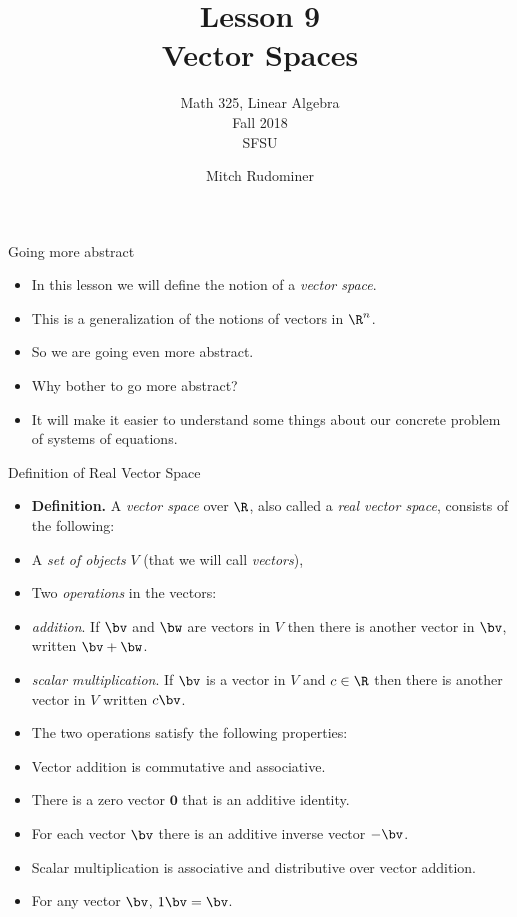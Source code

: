 \documentclass{beamer}
\title{Lesson 9 \\ Vector Spaces}
\subtitle{Math 325, Linear Algebra \\ Fall 2018 \\ SFSU}
\author{Mitch Rudominer}
\date{}
\begin{document}
\begin{frame}
  \titlepage
\end{frame}

\begin{frame}{Going more abstract}

\begin{itemize}
\item In this lesson we will define the notion of a \emph{vector space}.
\item This is a generalization of the notions of vectors in $\R^n$.
\item So we are going even more abstract.
\item Why bother to go more abstract?
\item It will make it easier to understand some things about our concrete
problem of systems of equations.
\end{itemize}
\end{frame}

\begin{frame}{Definition of Real Vector Space}

\begin{itemize}
\item \textbf{Definition.} A \emph{vector space} over $\R$, also called
a \emph{real vector space}, consists of the following:
\item A \emph{set of objects} $V$ (that we will call \emph{vectors}),
\item Two \emph{operations} in the vectors:
\item \emph{addition}. If $\bv$ and $\bw$ are vectors in $V$ then
there is another vector in $\bv$, written $\bv+\bw$.
\item \emph{scalar multiplication}. If $\bv$ is a vector in $V$ and
$c\in\R$ then there is another vector in $V$ written $c\bv$.
\item The two operations satisfy the following properties:
\item Vector addition is commutative and associative.
\item There is a zero vector $\mathbf{0}$ that is an additive identity.
\item For each vector $\bv$ there is an additive inverse vector $-\bv$.
\item Scalar multiplication is associative and distributive over vector addition.
\item For any vector $\bv$, $1\bv = \bv$.
\end{itemize}
\end{frame}
\end{document}
